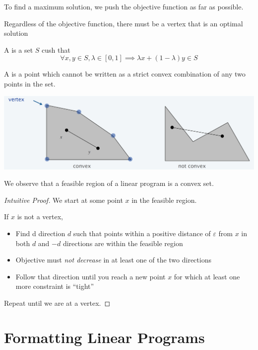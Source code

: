 To find a maximum solution, we push the objective function as far as possible. 

\begin{claim}
    Regardless of the objective function, there must be a vertex that is an optimal solution
\end{claim}

\begin{remark}[Convexity]
    A  is a set $S$ cush that \[
        \forall x, y \in S, \lambda \in [0, 1] \implies \lambda x + (1 - \lambda)y \in S
    \]

    A  is a point which cannot be written as a strict convex combination of any two points in the set.

    \begin{center}
        \includegraphics[width=0.75\linewidth]{figures/convexity.png}
    \end{center}

    We observe that a feasible region of a linear program is a convex set.
\end{remark}

\begin{proof}[Intuitive Proof]
    We start at some point $x$ in the feasible region. 

    If $x$ is not a vertex, 
    \begin{itemize}
        \item Find d direction $d$ such that points within a positive distance of $\varepsilon$ from $x$ in both $d$ and $-d$ directions are within the feasible region
        \item Objective must \textit{not decrease} in at least one of the two directions
        \item Follow that direction until you reach a new point $x$ for which at least one more constraint is ``tight''
    \end{itemize}

    Repeat until we are at a vertex. 
\end{proof}

\section{Formatting Linear Programs}

